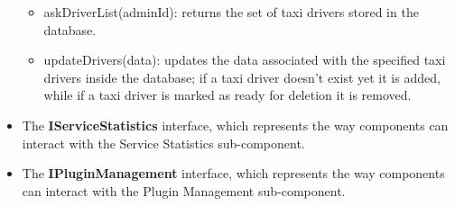 \begin{itemize}
\begin{itemize}
	\item askDriverList(adminId): returns the set of taxi drivers stored in the database.
	\item updateDrivers(data): updates the data associated with the specified taxi drivers inside the database; if a taxi driver doesn't exist yet it is added, while if a taxi driver is marked as ready for deletion it is removed.
	\end{itemize}
	\item The \textbf{IServiceStatistics} interface, which represents the way components can interact with the Service Statistics sub-component. 
	\item The \textbf{IPluginManagement} interface, which represents the way components can interact with the Plugin Management sub-component. 
\end{itemize}

